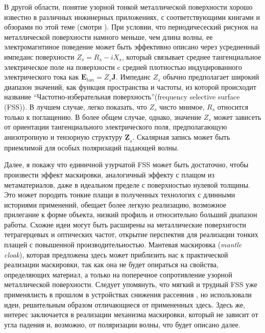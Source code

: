 \documentclass[12pt,a4paper]{article}
\begin{document}
В другой области, понятие узорной тонкой металлической поверхности хорошо известно
в различных инжинерных приложениях, с соответствующими книгами и обзорами по этой
теме (смотри \cite{14}). При условии, что периодичесеский рисунок на металлической
поверхности намного меньше, чем длина волны, ее электромагнтиное поведение может
быть эффективно описано через усредненный импеданс поверхности $Z_s = R_s - iX_s$,
который связывает среднее тангенциальное электрическое поле на поверхности c 
средней плотностью индуцированного электрического тока как $\textbf{E}_{tan}=
Z_s\textbf{J}$. Импеданс $Z_s$ обычно предполагает широкий диапазон значений, как
функция пространства и частоты, из которой происходит название 
``Частотно-изберательная поверхность''(frequency selective surface (FSS)). 
В лучшем случае, легко показать, что $Z_s$ чисто мнимое, $R_s$
относится только к поглащению. В более общем случае, однако, значение $Z_s$ может зависеть 
от ориентации
тангенциального электрического поля, предполагающую анизотропную и тензорную структуру 
$\underline{\textbf{Z}}_s$. Скалярная запись может быть приемлимой для особых поляризаций падающей волны.

Далее, я покажу что единичной узурчатой FSS может быть достаточно, чтобы произвести эффект маскировки,
аналогичный эффекту с плащом из метаматериалов, даже в идеальном пределе с поверхностью нулевой толщины.
Это может породить тонкие плащи в полученных технологих с длинными историями применений,
обещает более легкую реализацию, возможное прилегание к форме объекта, низкий профиль и относительно
больший диапазон работы. Схожие идеи могут быть расширены на металлические поверхнгости тетрагерцевых
и оптических частот, открытие перспектив для реализации тонких плащей с повышенной производительностью.
Мантевая маскировка (\textit{mantle cloak}), которая предложена здесь может приблизить нас к практической
реализации маскировки, так как она не будет опираться на свойства, определяющих материал, а только на
поперечное сопротивление узорной металлической поверхности. Следует упомянуть, что мягкий и трудный
FSS уже применялисть в прошлом в устройствах снижения рассеяния \cite{15}, но использовали идеи,
решительным образом отличающиеся от примененных здесь. Здесь же, интерес заключается в реализации
механизма маскировки, который не зависит от угла падения и, возможно, от поляризации волны, что будет
описано далее.
\end{document}
